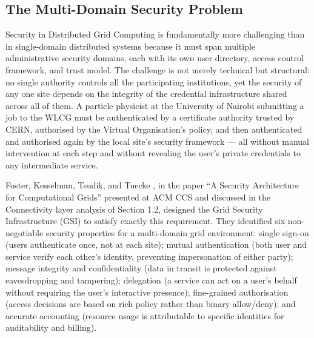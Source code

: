 \documentclass[12pt,a4paper]{report}
\begin{document}
\subsection*{The Multi-Domain Security Problem}
Security in Distributed Grid Computing is fundamentally more challenging than in single-domain distributed systems because it must span multiple
 administrative security domains, each with its own user directory, access control framework, and trust model. The challenge is not merely technical 
 but structural: no single authority controls all the participating institutions, yet the security of any one site depends on the integrity of the 
 credential infrastructure shared across all of them. A particle physicist at the University of Nairobi submitting a job to the WLCG must be
  authenticated by a certificate authority trusted by CERN, authorised by the Virtual Organisation’s policy, and then authenticated and authorised 
  again by the local site’s security framework — all without manual intervention at each step and without revealing the user’s private credentials
   to any intermediate service. 
   
   Foster, Kesselman, Tsudik, and Tuecke \parencite{foster1998}, in the paper “A Security Architecture for Computational Grids” presented
    at ACM CCS and discussed in the Connectivity layer analysis of Section 1.2, designed the Grid Security Infrastructure (GSI) to satisfy exactly this 
    requirement. They identified six non-negotiable security properties for a multi-domain grid environment: single sign-on (users authenticate once,
     not at each site); mutual authentication (both user and service verify each other’s identity, preventing impersonation of either party); message 
     integrity and confidentiality (data in transit is protected against eavesdropping and tampering); delegation (a service can act on a user’s behalf
      without requiring the user’s interactive presence); fine-grained authorisation (access decisions are based on rich policy rather than binary 
      allow/deny); and accurate accounting (resource usage is attributable to specific identities for auditability and billing). 
      
\end{document}

